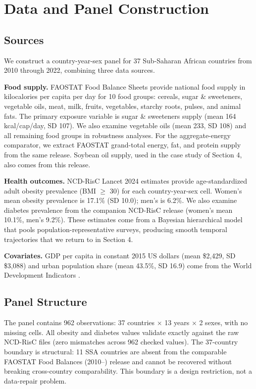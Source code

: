 \section{Data and Panel Construction}

\subsection{Sources}

We construct a country-year-sex panel for 37 Sub-Saharan African countries from 2010 through 2022, combining three data sources.

\textbf{Food supply.} FAOSTAT Food Balance Sheets \cite{faostat2024} provide national food supply in kilocalories per capita per day for 10 food groups: cereals, sugar \& sweeteners, vegetable oils, meat, milk, fruits, vegetables, starchy roots, pulses, and animal fats. The primary exposure variable is sugar \& sweeteners supply (mean 164 kcal/cap/day, SD 107). We also examine vegetable oils (mean 233, SD 108) and all remaining food groups in robustness analyses. For the aggregate-energy comparator, we extract FAOSTAT grand-total energy, fat, and protein supply from the same release. Soybean oil supply, used in the case study of Section 4, also comes from this release.

\textbf{Health outcomes.} NCD-RisC Lancet 2024 estimates \cite{ncdrisc2024bmi} provide age-standardized adult obesity prevalence (BMI $\geq$ 30) for each country-year-sex cell. Women's mean obesity prevalence is 17.1\% (SD 10.0); men's is 6.2\%. We also examine diabetes prevalence from the companion NCD-RisC release \cite{ncdrisc2024diabetes} (women's mean 10.1\%, men's 9.2\%). These estimates come from a Bayesian hierarchical model that pools population-representative surveys, producing smooth temporal trajectories that we return to in Section 4.

\textbf{Covariates.} GDP per capita in constant 2015 US dollars (mean \$2,429, SD \$3,088) and urban population share (mean 43.5\%, SD 16.9) come from the World Development Indicators \cite{wdi2024}.

\subsection{Panel Structure}

The panel contains 962 observations: 37 countries $\times$ 13 years $\times$ 2 sexes, with no missing cells. All obesity and diabetes values validate exactly against the raw NCD-RisC files (zero mismatches across 962 checked values). The 37-country boundary is structural: 11 SSA countries are absent from the comparable FAOSTAT Food Balances (2010--) release and cannot be recovered without breaking cross-country comparability. This boundary is a design restriction, not a data-repair problem.

